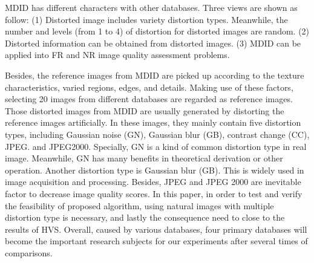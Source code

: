 MDID has different characters with other databases. Three views are shown as follow:
(1) Distorted image includes variety distortion types. Meanwhile, the number and levels (from 1 to 4) of distortion for distorted images are random.
(2) Distorted information can be obtained from distorted images.
(3) MDID can be applied into FR and NR image quality assessment problems.
                                                                                                                                                                                                                                                                                                                                                                                                                                                                                                                                                                                                                                                                                                                                                                                                                                                                                                                                                                  
Besides, the reference images from MDID are picked up according to the texture characteristics, varied regions, edges, and details. Making use of these factors, selecting 20 images from different databases are regarded as reference images. Those distorted images from MDID are usually generated by distorting the reference images artificially. In these images, they mainly contain five distortion types, including Gaussian noise (GN), Gaussian blur (GB), contrast change (CC), JPEG. and JPEG2000. Specially, GN is a kind of common distortion type in real image. Meanwhile, GN has many benefits in theoretical derivation or other operation. Another distortion type is Gaussian blur (GB). This is widely used in image acquisition and processing. Besides, JPEG and JPEG 2000 are inevitable factor to decrease image quality scores. In this paper, in order to test and verify the feasibility of proposed algorithm, using natural images with multiple distortion type is necessary, and lastly the consequence need to close to the results of HVS. Overall, caused by various databases, four primary databases will become the important research subjects for our experiments after several times of comparisons.

